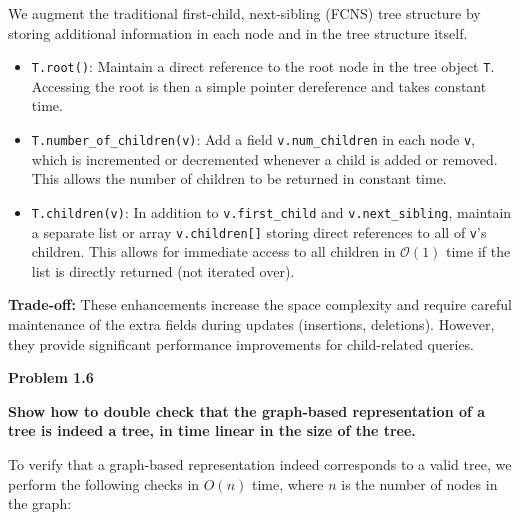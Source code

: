\documentclass{article}
\begin{document}
We augment the traditional first-child, next-sibling (FCNS) tree structure by storing additional information in each node and in the tree structure itself.

\begin{itemize}
    \item \texttt{T.root()}: Maintain a direct reference to the root node in the tree object \texttt{T}. Accessing the root is then a simple pointer dereference and takes constant time.

    \item \texttt{T.number\_of\_children(v)}: Add a field \texttt{v.num\_children} in each node \texttt{v}, which is incremented or decremented whenever a child is added or removed. This allows the number of children to be returned in constant time.

    \item \texttt{T.children(v)}: In addition to \texttt{v.first\_child} and \texttt{v.next\_sibling}, maintain a separate list or array \texttt{v.children[]} storing direct references to all of \texttt{v}'s children. This allows for immediate access to all children in $\mathcal{O}(1)$ time if the list is directly returned (not iterated over).
\end{itemize}

\textbf{Trade-off:}  
These enhancements increase the space complexity and require careful maintenance of the extra fields during updates (insertions, deletions). However, they provide significant performance improvements for child-related queries.

\textbf{Problem 1.6}

\textbf{Show how to double check that the graph-based representation of a tree is indeed a tree, in time linear in the size of the tree.}

To verify that a graph-based representation indeed corresponds to a valid tree, we perform the following checks in $O(n)$ time, where $n$ is the number of nodes in the graph:
\end{document}
